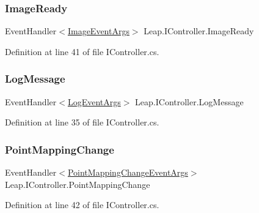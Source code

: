 \mbox{\label{interface_leap_1_1_i_controller_a1407d879e8e65f00764020fba8f33843}} 
\subsubsection{\texorpdfstring{ImageReady}{ImageReady}}
{\footnotesize\ttfamily Event\+Handler$<$\mbox{\hyperlink{class_leap_1_1_image_event_args}{Image\+Event\+Args}}$>$ Leap.\+I\+Controller.\+Image\+Ready}



Definition at line 41 of file I\+Controller.\+cs.

\mbox{\label{interface_leap_1_1_i_controller_a408bbe35d7b05fb91b3f9a7ceb1b68aa}} 
\subsubsection{\texorpdfstring{LogMessage}{LogMessage}}
{\footnotesize\ttfamily Event\+Handler$<$\mbox{\hyperlink{class_leap_1_1_log_event_args}{Log\+Event\+Args}}$>$ Leap.\+I\+Controller.\+Log\+Message}



Definition at line 35 of file I\+Controller.\+cs.

\mbox{\label{interface_leap_1_1_i_controller_ac56b86e0d64e2015d529c8d6e85f1f93}} 
\subsubsection{\texorpdfstring{PointMappingChange}{PointMappingChange}}
{\footnotesize\ttfamily Event\+Handler$<$\mbox{\hyperlink{class_leap_1_1_point_mapping_change_event_args}{Point\+Mapping\+Change\+Event\+Args}}$>$ Leap.\+I\+Controller.\+Point\+Mapping\+Change}



Definition at line 42 of file I\+Controller.\+cs.

